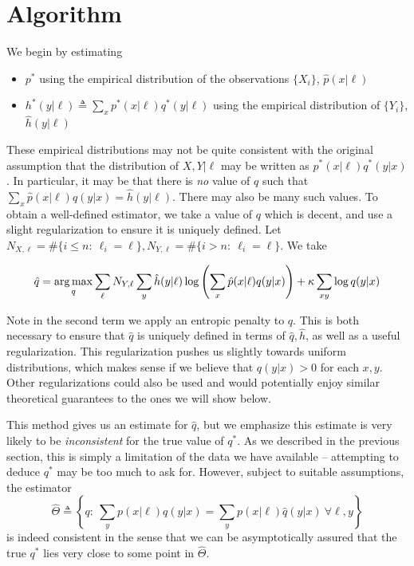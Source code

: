 \section{Algorithm}

We begin by estimating

\begin{itemize}
\item $p^*$ using the empirical distribution of the observations $\{X_i\}$, $\hat p(x|\ell)$
\item $h^*(y|\ell)\triangleq \sum_x p^*(x|\ell)q^*(y|\ell)$ using the empirical distribution of $\{Y_i\}$, $\hat h(y|\ell)$
\end{itemize}

These empirical distributions may not be quite consistent with the original assumption that the distribution of $X,Y|\ell$ may be written as $p^*(x|\ell)q^*(y|x)$.  In particular, it may be that there is \emph{no} value of $q$ such that $\sum_x \hat p(x|\ell) q(y|x) = \hat h(y|\ell)$.  There may also be many such values.  To obtain a well-defined estimator, we take a value of $q$ which is decent, and use a slight regularization to ensure it is uniquely defined.  Let $N_{X,\ell}=\#\{i\leq n:\ \ell_i=\ell\},N_{Y,\ell}=\#\{i> n:\ \ell_i=\ell\}$.  We take

\begin{equation*}
\hat q = \operatorname*{arg\,max}_q \sum_\ell N_{Y,\ell}\sum_{y}\hat h(y|\ell)\log\left(\sum_{x}\hat p(x|\ell)q(y|x)\right) + \kappa \sum_{xy} \log q(y|x)
\end{equation*}

Note in the second term we apply an entropic penalty to $q$.  This is both necessary to ensure that $\hat q$ is uniquely defined in terms of $\hat q,\hat h$, as well as a useful regularization. This regularization pushes us slightly towards uniform distributions, which makes sense if we believe that $q(y|x)>0$  for each $x,y$.  Other regularizations could also be used and would potentially enjoy similar theoretical guarantees to the ones we will show below.

This method gives us an estimate for $\hat q$, but we emphasize this estimate is very likely to be \emph{inconsistent} for the true value of $q^*$.  As we described in the previous section, this is simply a limitation of the data we have available -- attempting to deduce $q^*$ may be too much to ask for.  However, subject to suitable assumptions, the estimator
\begin{equation*}
\hat \Theta\triangleq \left\{q:\ \sum_y p(x|\ell)q(y|x) = \sum_y p(x|\ell)\hat q(y|x)\ \forall \ell,y\right\}
\end{equation*}
is indeed consistent in the sense that we can be asymptotically assured that the true $q^*$ lies very close to some point in $\hat \Theta$.

